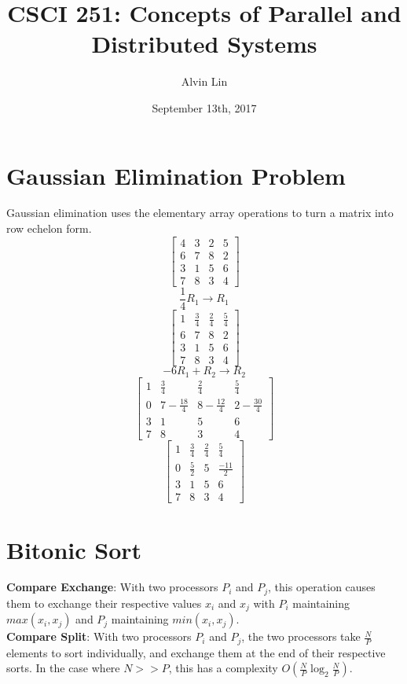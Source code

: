 \documentclass[letterpaper, 12pt]{math}
\title{CSCI 251: Concepts of Parallel and Distributed Systems}
\author{Alvin Lin}
\date{September 13th, 2017}
\begin{document}
\maketitle

\section*{Gaussian Elimination Problem}
Gaussian elimination uses the elementary array operations to turn a matrix
into row echelon form.
\[ \begin{bmatrix}
  4 & 3 & 2 & 5 \\
  6 & 7 & 8 & 2 \\
  3 & 1 & 5 & 6 \\
  7 & 8 & 3 & 4
\end{bmatrix} \]
\[ \frac{1}{4}R_1\to R_1 \]
\[ \begin{bmatrix}
  1 & \frac{3}{4} & \frac{2}{4} & \frac{5}{4} \\
  6 & 7 & 8 & 2 \\
  3 & 1 & 5 & 6 \\
  7 & 8 & 3 & 4
\end{bmatrix} \]
\[ -6R_1+R_2\to R_2 \]
\[ \begin{bmatrix}
  1 & \frac{3}{4} & \frac{2}{4} & \frac{5}{4} \\
  0 & 7-\frac{18}{4} & 8-\frac{12}{4} & 2-\frac{30}{4} \\
  3 & 1 & 5 & 6 \\
  7 & 8 & 3 & 4
\end{bmatrix} \]
\[ \begin{bmatrix}
  1 & \frac{3}{4} & \frac{2}{4} & \frac{5}{4} \\
  0 & \frac{5}{2} & 5 & \frac{-11}{2} \\
  3 & 1 & 5 & 6 \\
  7 & 8 & 3 & 4
\end{bmatrix} \]

\section*{Bitonic Sort}
\textbf{Compare Exchange}: With two processors \( P_i \) and \( P_j \), this
operation causes them to exchange their respective values \( x_i \) and
\( x_j \) with \( P_i \) maintaining \( max(x_i,x_j) \) and \( P_j \)
maintaining \( min(x_i,x_j) \). \\
\textbf{Compare Split}: With two processors \( P_i \) and \( P_j \), the
two processors take \( \frac{N}{P} \) elements to sort individually, and
exchange them at the end of their respective sorts. In the case where
\( N >> P \), this has a complexity \( O(\frac{N}{P}\log_2\frac{N}{P}) \).
\end{document}
